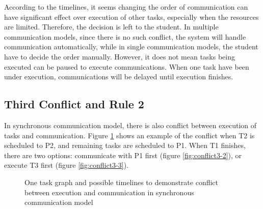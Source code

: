 \documentclass[msc,deptreport, cs]{infthesis}
\begin{document}
According to the timelines, it seems changing the order of communication can have significant effect over execution of other tasks, especially when the resources are limited. Therefore, the decision is left to the student. In multiple communication models, since there is no such conflict, the system will handle communication automatically, while in single communication models, the student have to decide the order manually. However, it does not mean tasks being executed can be paused to execute communications. When one task have been under execution, communications will be delayed until execution finishes.

\subsection{Third Conflict and Rule 2} \label{sec:rule2}

In synchronous communication model, there is also conflict between execution of tasks and communication. Figure \ref{fig:conflict3} shows an example of the conflict when T2 is scheduled to P2, and remaining tasks are scheduled to P1. When T1 finishes, there are two options: communicate with P1 first (figure \ref{fig:conflict3-2}), or execute T3 first (figure \ref{fig:conflict3-3}).

\begin{figure}[!htb]
  \centering
   \hspace{1em}
   \hspace{1em}
  \caption{One task graph and possible timelines to demonstrate conflict between execution and communication in synchronous communication model}
  \label{fig:conflict3}
\end{figure}
\end{document}
